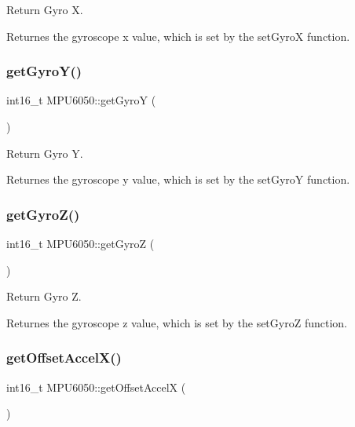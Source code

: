 Return Gyro X. 

Returnes the gyroscope x value, which is set by the set\+GyroX function. \mbox{\label{class_m_p_u6050_a596664a8580696b30b614285ed8cb7fe}} 
\subsubsection{\texorpdfstring{get\+Gyro\+Y()}{getGyroY()}}
{\footnotesize\ttfamily int16\+\_\+t M\+P\+U6050\+::get\+GyroY (\begin{DoxyParamCaption}{ }\end{DoxyParamCaption})}



Return Gyro Y. 

Returnes the gyroscope y value, which is set by the set\+GyroY function. \mbox{\label{class_m_p_u6050_a4caf0233714ab9815e860eba4c167aad}} 
\subsubsection{\texorpdfstring{get\+Gyro\+Z()}{getGyroZ()}}
{\footnotesize\ttfamily int16\+\_\+t M\+P\+U6050\+::get\+GyroZ (\begin{DoxyParamCaption}{ }\end{DoxyParamCaption})}



Return Gyro Z. 

Returnes the gyroscope z value, which is set by the set\+GyroZ function. \mbox{\label{class_m_p_u6050_ad399b5702208fd9bad445abd25c16182}} 
\subsubsection{\texorpdfstring{get\+Offset\+Accel\+X()}{getOffsetAccelX()}}
{\footnotesize\ttfamily int16\+\_\+t M\+P\+U6050\+::get\+Offset\+AccelX (\begin{DoxyParamCaption}{ }\end{DoxyParamCaption})}



